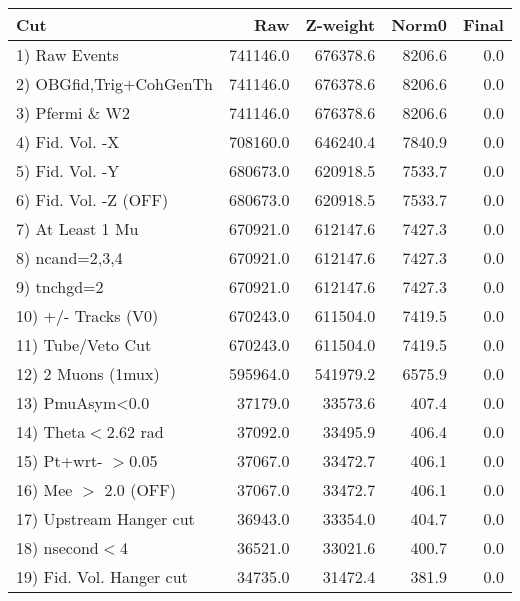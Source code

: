  \begin{table}[h!]\centering
 \begin{tabular}{||l||r|r|r|r||}
 \hline
 \hline
 Cut & Raw & Z-weight & Norm0 & Final \\
 \hline
  1) Raw Events           &    741146.0 &    676378.6 &      8206.6 &         0.0 \\
  2) OBGfid,Trig+CohGenTh &    741146.0 &    676378.6 &      8206.6 &         0.0 \\
  3) Pfermi \& W2         &    741146.0 &    676378.6 &      8206.6 &         0.0 \\
  4) Fid. Vol. -X         &    708160.0 &    646240.4 &      7840.9 &         0.0 \\
  5) Fid. Vol. -Y         &    680673.0 &    620918.5 &      7533.7 &         0.0 \\
  6) Fid. Vol. -Z (OFF)   &    680673.0 &    620918.5 &      7533.7 &         0.0 \\
  7) At Least 1 Mu        &    670921.0 &    612147.6 &      7427.3 &         0.0 \\
  8) ncand=2,3,4          &    670921.0 &    612147.6 &      7427.3 &         0.0 \\
  9) tnchgd=2             &    670921.0 &    612147.6 &      7427.3 &         0.0 \\
 10) +/- Tracks (V0)      &    670243.0 &    611504.0 &      7419.5 &         0.0 \\
 11) Tube/Veto Cut        &    670243.0 &    611504.0 &      7419.5 &         0.0 \\
 12) 2 Muons (1mux)       &    595964.0 &    541979.2 &      6575.9 &         0.0 \\
 13) PmuAsym<0.0          &     37179.0 &     33573.6 &       407.4 &         0.0 \\
 14) Theta$<$2.62 rad     &     37092.0 &     33495.9 &       406.4 &         0.0 \\
 15) Pt+wrt- $>$0.05      &     37067.0 &     33472.7 &       406.1 &         0.0 \\
 16) Mee $>$ 2.0  (OFF)   &     37067.0 &     33472.7 &       406.1 &         0.0 \\
 17) Upstream Hanger cut  &     36943.0 &     33354.0 &       404.7 &         0.0 \\
 18) nsecond$<$4          &     36521.0 &     33021.6 &       400.7 &         0.0 \\
 19) Fid. Vol. Hanger cut &     34735.0 &     31472.4 &       381.9 &         0.0 \\

\end{tabular}
\end{table}
